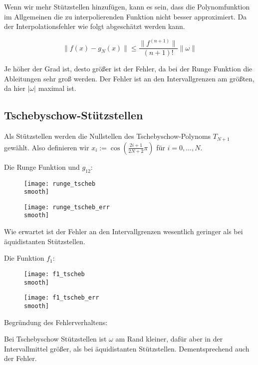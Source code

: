 \documentclass[]{scrartcl}
\begin{document}
	Wenn wir mehr Stützstellen hinzufügen, kann es sein, dass die Polynomfunktion im Allgemeinen die zu interpolierenden Funktion nicht besser approximiert. Da der Interpolationsfehler wie folgt abgeschätzt werden kann.
	
	\[\lVert f(x)-g_N(x) \rVert\leq\frac{\lVert f^{(n+1)}\rVert}{(n+1)!}\lVert\omega\rVert\]
	
	Je höher der Grad ist, desto größer ist der Fehler, da bei der Runge Funktion die Ableitungen sehr groß werden. Der Fehler ist an den Intervallgrenzen am größten, da hier $|\omega|$ maximal ist. 
	
	\subsection{Tschebyschow-Stützstellen}
	Als Stützstellen werden die Nullstellen des Tschebyschow-Polynoms $T_{N+1}$ gewählt. Also definieren wir $x_i:=\cos(\frac{2i+1}{2N+2}\pi)$ für $i=0,\dots,N$.

	\newpage
	Die Runge Funktion und $g_{12}$:
	\begin{figure}[H]
		\centering
		\begin{minipage}{0.5\textwidth}
			\texttt{[image: runge\_tscheb\\smooth]}
			\caption{\label{Abb.3}}
		\end{minipage}
		\begin{minipage}{0.49\textwidth}
			\texttt{[image: runge\_tscheb\_err\\smooth]}
			\caption{\label{Abb.4}}
		\end{minipage}
	\end{figure}
	
	Wie erwartet ist der Fehler an den Intervallgrenzen wesentlich geringer als bei äquidistanten Stützstellen.
	
	Die Funktion $f_1$:
	\begin{figure}[H]
		\centering
		\begin{minipage}{0.5\textwidth}
			\texttt{[image: f1\_tscheb\\smooth]}
			\caption{}
		\end{minipage}
		\begin{minipage}{0.49\textwidth}
			\texttt{[image: f1\_tscheb\_err\\smooth]}
			\caption{}
		\end{minipage}
	\end{figure}
	
	Begründung des Fehlerverhaltens:
	
	Bei Tschebyschow Stützstellen ist $\omega$ am Rand kleiner, dafür aber in der Intervallmittel größer, als bei äquidistanten Stützstellen. Dementsprechend auch der Fehler.
	
\end{document}
